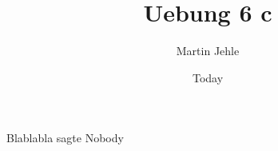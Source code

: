 \documentclass[11pt]{article}
\begin{document}
\title{Uebung 6 c}
\author{Martin Jehle}
\date{Today}
\maketitle

Blablabla sagte Nobody ~\cite{Uebung6}

{}

\end{document}
